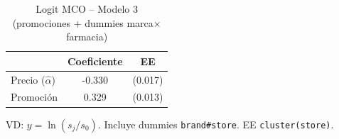 \begin{table}[H]
\centering
\caption{Logit MCO -- Modelo 3 (promociones + dummies marca$\times$farmacia)}
\begin{tabular}{lcc}
\toprule
& Coeficiente & EE \\
\midrule
Precio ($\hat{\alpha}$) & -0.330 & (0.017) \\
Promoci\'on & 0.329 & (0.013) \\
\bottomrule
\end{tabular}

\smallskip
{\footnotesize\begin{minipage}{0.92\linewidth}VD: $y=\ln(s_j/s_0)$. Incluye dummies \texttt{brand\#store}. EE \texttt{cluster(store)}.\end{minipage}}
\end{table}
